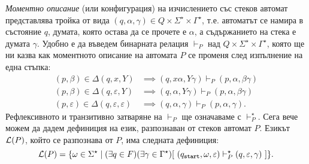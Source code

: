 {\em Моментно описание} (или конфигурация) на изчислението със стеков автомат представлява тройка от вида $(q,\alpha,\gamma) \in Q\times\Sigma^\star\times\Gamma^\star$,
т.е. автоматът се намира в състояние $q$, думата, която остава да се прочете е $\alpha$,
а съдържанието на стека е думата $\gamma$.
Удобно е да въведем бинарната релация $\vdash_P$ над $Q\times\Sigma^\star\times\Gamma^\star$,
която ще ни казва как моментното описание на автомата $P$ се променя след изпълнение на една стъпка:
\begin{align*}
  (p,\beta) \in \Delta(q,x,Y) & \implies (q,x\alpha,Y\gamma) \vdash_P (p,\alpha,\beta\gamma)\\
  (p,\beta) \in \Delta(q,\varepsilon,Y) & \implies (q,\alpha,Y\gamma) \vdash_P (p,\alpha,\beta\gamma)\\
  (p,\varepsilon) \in \Delta(q,\varepsilon,\varepsilon) & \implies (q,\alpha,\gamma) \vdash_P (p,\alpha,\gamma).
\end{align*}
Рефлексивното и транзитивно затваряне на $\vdash_P$ ще означаваме с $\vdash^\star_P$.
Сега вече можем да дадем дефиниция на език, разпознаван от стеков автомат $P$.
{}
Езикът $\mathcal{L}(P)$, който се разпознава от $P$, има следната дефиниция:
\[\mathcal{L}(P) = \{\omega \in \Sigma^\star \mid (\exists q \in F)(\exists \gamma \in \Gamma^\star)[\ (q_{\texttt{start}},\omega,\varepsilon) \vdash^\star_P (q,\varepsilon,\gamma)\ ]\}.\]    

